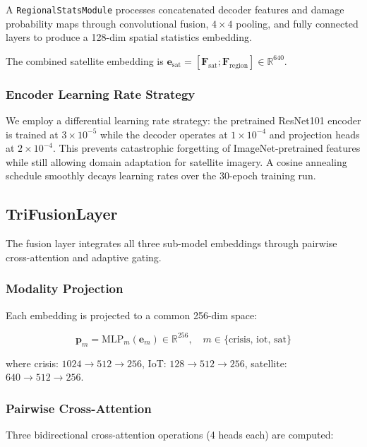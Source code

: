 \documentclass[journal]{IEEEtran}
\begin{document}
A \texttt{RegionalStatsModule} processes concatenated decoder features and damage probability maps through convolutional fusion, $4 \times 4$ pooling, and fully connected layers to produce a 128-dim spatial statistics embedding.

The combined satellite embedding is $\mathbf{e}_\text{sat} = [\mathbf{F}_\text{sat}; \mathbf{F}_\text{region}] \in \mathbb{R}^{640}$.

\subsubsection{Encoder Learning Rate Strategy}

We employ a differential learning rate strategy: the pretrained ResNet101 encoder is trained at $3 \times 10^{-5}$ while the decoder operates at $1 \times 10^{-4}$ and projection heads at $2 \times 10^{-4}$. This prevents catastrophic forgetting of ImageNet-pretrained features while still allowing domain adaptation for satellite imagery. A cosine annealing schedule smoothly decays learning rates over the 30-epoch training run.

\subsection{TriFusionLayer}

The fusion layer integrates all three sub-model embeddings through pairwise cross-attention and adaptive gating.

\subsubsection{Modality Projection}

Each embedding is projected to a common 256-dim space:

\begin{equation}
\mathbf{p}_m = \text{MLP}_m(\mathbf{e}_m) \in \mathbb{R}^{256}, \quad m \in \{\text{crisis, iot, sat}\}
\end{equation}

where crisis: $1024 \to 512 \to 256$, IoT: $128 \to 512 \to 256$, satellite: $640 \to 512 \to 256$.

\subsubsection{Pairwise Cross-Attention}

Three bidirectional cross-attention operations (4 heads each) are computed:
\end{document}
